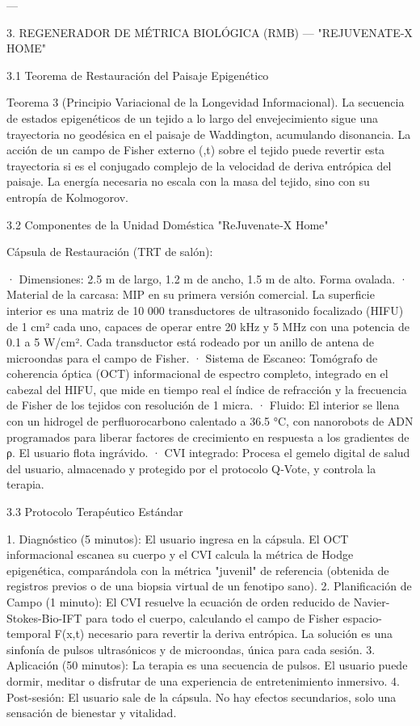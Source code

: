 \documentclass[12pt,twoside]{book}
\begin{document}
---

3. REGENERADOR DE MÉTRICA BIOLÓGICA (RMB) — "REJUVENATE‑X HOME"

3.1 Teorema de Restauración del Paisaje Epigenético

Teorema 3 (Principio Variacional de la Longevidad Informacional). La secuencia de estados epigenéticos de un tejido a lo largo del envejecimiento sigue una trayectoria no geodésica en el paisaje de Waddington, acumulando disonancia. La acción de un campo de Fisher externo  (,t)  sobre el tejido puede revertir esta trayectoria si    es el conjugado complejo de la velocidad de deriva entrópica del paisaje. La energía necesaria no escala con la masa del tejido, sino con su entropía de Kolmogorov.

3.2 Componentes de la Unidad Doméstica "ReJuvenate‑X Home"

Cápsula de Restauración (TRT de salón):

· Dimensiones: 2.5 m de largo, 1.2 m de ancho, 1.5 m de alto. Forma ovalada.
· Material de la carcasa: MIP en su primera versión comercial. La superficie interior es una matriz de 10 000 transductores de ultrasonido focalizado (HIFU) de 1 cm² cada uno, capaces de operar entre 20 kHz y 5 MHz con una potencia de 0.1 a 5 W/cm². Cada transductor está rodeado por un anillo de antena de microondas para el campo de Fisher.
· Sistema de Escaneo: Tomógrafo de coherencia óptica (OCT) informacional de espectro completo, integrado en el cabezal del HIFU, que mide en tiempo real el índice de refracción y la frecuencia de Fisher de los tejidos con resolución de 1 micra.
· Fluido: El interior se llena con un hidrogel de perfluorocarbono calentado a 36.5 °C, con nanorobots de ADN programados para liberar factores de crecimiento en respuesta a los gradientes de ρ. El usuario flota ingrávido.
· CVI integrado: Procesa el gemelo digital de salud del usuario, almacenado y protegido por el protocolo Q‑Vote, y controla la terapia.

3.3 Protocolo Terapéutico Estándar

1. Diagnóstico (5 minutos): El usuario ingresa en la cápsula. El OCT informacional escanea su cuerpo y el CVI calcula la métrica de Hodge epigenética, comparándola con la métrica "juvenil" de referencia (obtenida de registros previos o de una biopsia virtual de un fenotipo sano).
2. Planificación de Campo (1 minuto): El CVI resuelve la ecuación de orden reducido de Navier-Stokes-Bio-IFT para todo el cuerpo, calculando el campo de Fisher espacio-temporal  F(x,t)  necesario para revertir la deriva entrópica. La solución es una sinfonía de pulsos ultrasónicos y de microondas, única para cada sesión.
3. Aplicación (50 minutos): La terapia es una secuencia de pulsos. El usuario puede dormir, meditar o disfrutar de una experiencia de entretenimiento inmersivo.
4. Post-sesión: El usuario sale de la cápsula. No hay efectos secundarios, solo una sensación de bienestar y vitalidad.
\end{document}
